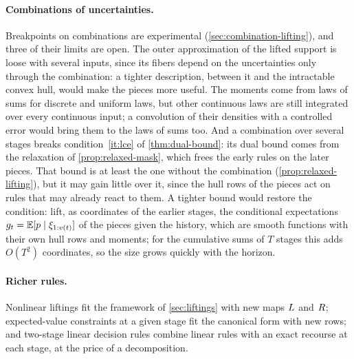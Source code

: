 \paragraph{Combinations of uncertainties.}
Breakpoints on combinations are experimental (\cref{sec:combination-lifting}), and three of their limits are open.
The outer approximation of the lifted support is loose with several inputs, since its fibers depend on the uncertainties only through the combination:
a tighter description, between it and the intractable convex hull, would make the pieces more useful.
The moments come from laws of sums for discrete and uniform laws, but other continuous laws are still integrated over every continuous input;
a convolution of their densities with a controlled error would bring them to the laws of sums too.
And a combination over several stages breaks condition~\ref{it:lce} of \cref{thm:dual-bound}: its dual bound comes from the relaxation of \cref{prop:relaxed-mask}, which frees the early rules on the later pieces.
That bound is at least the one without the combination (\cref{prop:relaxed-lifting}), but it may gain little over it, since the hull rows of the pieces act on rules that may already react to them.
A tighter bound would restore the condition: lift, as coordinates of the earlier stages, the conditional expectations $g_t = \mathbb{E}[p \mid \xi_{1:v(t)}]$ of the pieces given the history,
which are smooth functions with their own hull rows and moments;
for the cumulative sums of $T$ stages this adds $O(T^2)$ coordinates,
so the size grows quickly with the horizon.

\paragraph{Richer rules.}
Nonlinear liftings \citep[Section~5]{GWK2015} fit the framework of \cref{sec:liftings} with new maps $L$ and $R$;
expected-value constraints at a given stage \citep[(MSP)]{KWG2011} fit the canonical form with new rows;
and two-stage linear decision rules \citep{BodurLuedtke2022} combine linear rules with an exact recourse at each stage, at the price of a decomposition.
